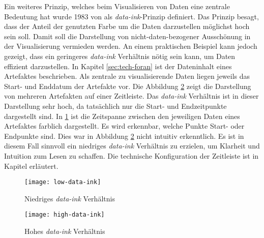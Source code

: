 %
\par {} Ein weiteres Prinzip, welches beim Visualisieren von Daten eine zentrale Bedeutung hat wurde 1983 von \citeauthor{tufteBookReviewsVisual1984} als \textit{data-ink}-Prinzip definiert. Das Prinzip besagt, dass der Anteil der genutzten Farbe um die Daten darzustellen möglichst hoch sein soll. Damit soll die Darstellung von nicht-daten-bezogener \glqq Ausschönung \grqq in der Visualisierung vermieden werden. An einem praktischen Beispiel kann jedoch gezeigt, dass ein geringeres \textit{data-ink} Verhältnis nötig sein kann, um Daten effizient darzustellen. In Kapitel \ref{sec:tech-foran} ist der Dateninhalt eines Artefaktes beschrieben. Als zentrale zu visualisierende Daten liegen jeweils das Start- und Enddatum der Artefakte vor. Die Abbildung \ref{fig:high-data-ink} zeigt die Darstellung von mehreren Artefakten auf einer Zeitleiste. Das \textit{data-ink} Verhältnis ist in dieser Darstellung sehr hoch, da tatsächlich nur die Start- und Endzeitpunkte dargestellt sind. In \ref{fig:low-data-ink} ist die Zeitspanne zwischen den jeweiligen Daten eines Artefaktes farblich dargestellt. Es wird erkennbar, welche Punkte Start- oder Endpunkte sind. Dies war in Abbildung \ref{fig:high-data-ink} nicht intuitiv erkenntlich. Es ist in diesem Fall sinnvoll ein niedriges \textit{data-ink} Verhältnis zu erzielen, um Klarheit und Intuition zum Lesen zu schaffen. Die technische Konfiguration der Zeitleiste ist in Kapitel  erläutert.
%
\begin{figure}[H]
    \centering
    \texttt{[image: low-data-ink]}
    \caption{Niedriges \textit{data-ink} Verhältnis}
    \label{fig:low-data-ink}
\end{figure}
%
\begin{figure}[H]
    \centering
    \texttt{[image: high-data-ink]}
    \caption{Hohes \textit{data-ink} Verhältnis}
    \label{fig:high-data-ink}
\end{figure}
%
